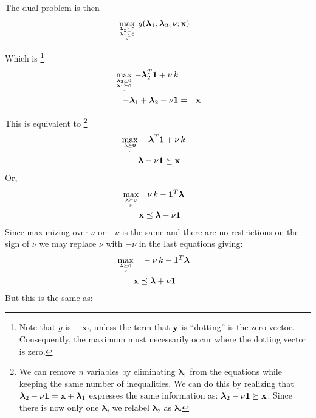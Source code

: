 \documentclass[12pt]{article}
\begin{document}
The dual problem is then
\begin{eqnarray}
	\mathop{\rm max}_{{{\boldsymbol \lambda}_2 \succeq {\bf 0}} \atop {{{\boldsymbol \lambda}_1 \succeq {\bf 0}} \atop \nu}} g({\boldsymbol \lambda}_1, {\boldsymbol \lambda}_2, \nu; {\bf x}) & & 
\end{eqnarray}

Which is%
\footnote{Note that $g$ is $-\infty$, unless the term that ${\bf y}$ is ``dotting'' is the zero vector. Consequently, the maximum
must necessarily occur where the dotting vector is zero.}
\begin{eqnarray}
	\mathop{\rm max}_{{{\boldsymbol \lambda}_2 \succeq {\bf 0}} \atop {{{\boldsymbol \lambda}_1 \succeq {\bf 0}} \atop \nu}} - {\boldsymbol \lambda}_2^T {\bf 1} + \nu \, k &&\\ 
	- {\boldsymbol \lambda}_1 + {\boldsymbol \lambda}_2 - \nu {\bf 1}  &=& {\bf x} 
\end{eqnarray}

This is equivalent to%
\footnote{We can remove $n$ variables by eliminating ${\boldsymbol \lambda}_1$ from the equations while keeping
	the same number of inequalities. We can do this by realizing that ${\boldsymbol \lambda}_2 - \nu {\bf 1} = {\bf x} + {\boldsymbol \lambda}_1$ 
	expresses the same information as: ${\boldsymbol \lambda}_2 - \nu {\bf 1} \succeq {\bf x}$. Since there is now only one ${\boldsymbol \lambda}$,
we relabel ${\boldsymbol \lambda}_2$ as ${\boldsymbol \lambda}$.}
\begin{eqnarray}
	\mathop{\rm max}_{{{\boldsymbol \lambda} \succeq {\bf 0}} \atop \nu} & - {\boldsymbol \lambda}^T {\bf 1} + \nu \, k & \\
																		 & {\boldsymbol \lambda} - \nu {\bf 1} \succeq {\bf x} & 
\end{eqnarray}
Or,
\begin{eqnarray}
	\mathop{\rm max}_{{{\boldsymbol \lambda} \succeq {\bf 0}} \atop \nu} & \quad \nu \, k - {\bf 1}^T {\boldsymbol \lambda} & \\ 
																		 &  {\bf x} \preceq {\boldsymbol \lambda} - \nu {\bf 1} &
 \end{eqnarray}
Since maximizing over $\nu$ or $-\nu$ is the same and there are no restrictions on the sign of $\nu$ we may replace $\nu$ with $-\nu$ 
in the last equations giving:
\begin{eqnarray}
	\mathop{\rm max}_{{{\boldsymbol \lambda} \succeq {\bf 0}} \atop \nu} & \quad -\nu \, k - {{\bf 1}^T \boldsymbol \lambda} & \\ 
																		 &  {\bf x} \preceq {\boldsymbol \lambda} + \nu {\bf 1} &
 \end{eqnarray}
But this is the same as:
\end{document}
